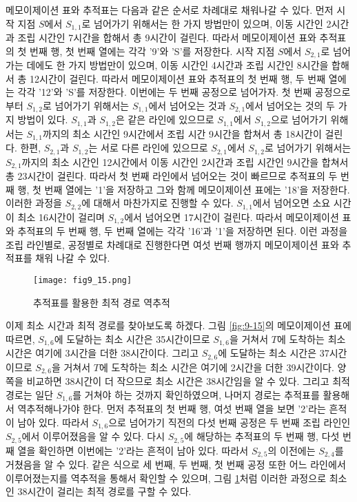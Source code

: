 \documentclass[a4paper]{oblivoir}
\begin{document}
메모이제이션 표와 추적표는 다음과 같은 순서로 차례대로 채워나갈 수 있다. 먼저 시작 지점 $S$에서 $S_{1,1}$로 넘어가기 위해서는 한 가지 방법만이 있으며, 이동 시간인 2시간과 조립 시간인 7시간을 합해서 총 9시간이 걸린다. 따라서 메모이제이션 표와 추적표의 첫 번째 행, 첫 번째 열에는 각각 '9'와 'S'를 저장한다. 시작 지점 $S$에서 $S_{2,1}$로 넘어가는 데에도 한 가지 방법만이 있으며, 이동 시간인 4시간과 조립 시간인 8시간을 합해서 총 12시간이 걸린다. 따라서 메모이제이션 표와 추적표의 첫 번째 행, 두 번째 열에는 각각 '12'와 'S'를 저장한다. 이번에는 두 번째 공정으로 넘어가자. 첫 번째 공정으로부터 $S_{1,2}$로 넘어가기 위해서는 $S_{1,1}$에서 넘어오는 것과 $S_{2,1}$에서 넘어오는 것의 두 가지 방법이 있다. $S_{1,1}$과 $S_{1,2}$은 같은 라인에 있으므로 $S_{1,1}$에서 $S_{1,2}$으로 넘어가기 위해서는 $S_{1,1}$까지의 최소 시간인 9시간에서 조립 시간 9시간을 합쳐서 총 18시간이 걸린다. 한편, $S_{2,1}$과 $S_{1,2}$는 서로 다른 라인에 있으므로 $S_{2,1}$에서 $S_{1,2}$로 넘어가기 위해서는 $S_{2,1}$까지의 최소 시간인 12시간에서 이동 시간인 2시간과 조립 시간인 9시간을 합쳐서 총 23시간이 걸린다. 따라서 첫 번째 라인에서 넘어오는 것이 빠르므로 추적표의 두 번째 행, 첫 번째 열에는 '1'을 저장하고 그와 함께 메모이제이션 표에는 '18'을 저장한다. 이러한 과정을 $S_{2,2}$에 대해서 마찬가지로 진행할 수 있다. $S_{1,1}$에서 넘어오면 소요 시간이 최소 16시간이 걸리며 $S_{1,2}$에서 넘어오면 17시간이 걸린다. 따라서 메모이제이션 표와 추적표의 두 번째 행, 두 번째 열에는 각각 '16'과 '1'을 저장하면 된다. 이런 과정을 조립 라인별로, 공정별로 차례대로 진행한다면 여섯 번째 행까지 메모이제이션 표와 추적표를 채워 나갈 수 있다. \\ 

\begin{figure}[ht] \centering 
\texttt{[image: fig9\_15.png]} 
\caption{추적표를 활용한 최적 경로 역추적}
\label{fig:9-16}
\end{figure}

이제 최소 시간과 최적 경로를 찾아보도록 하겠다. 그림 \ref{fig:9-15}의 메모이제이션 표에 따르면, $S_{1,6}$에 도달하는 최소 시간은 35시간이므로 $S_{1,6}$을 거쳐서 $T$에 도착하는 최소 시간은 여기에 3시간을 더한 38시간이다. 그리고 $S_{2,6}$에 도달하는 최소 시간은 37시간이므로 $S_{2,6}$을 거쳐서 $T$에 도착하는 최소 시간은 여기에 2시간을 더한 39시간이다. 양쪽을 비교하면 38시간이 더 작으므로 최소 시간은 38시간임을 알 수 있다. 그리고 최적 경로는 일단 $S_{1,6}$를 거쳐야 하는 것까지 확인하였으며, 나머지 경로는 추적표를 활용해서 역추적해나가야 한다. 먼저 추적표의 첫 번째 행, 여섯 번째 열을 보면 '2'라는 흔적이 남아 있다. 따라서 $S_{1,6}$으로 넘어가기 직전의 다섯 번째 공정은 두 번째 조립 라인인 $S_{2,5}$에서 이루어졌음을 알 수 있다. 다시 $S_{2,5}$에 해당하는 추적표의 두 번째 행, 다섯 번째 열을 확인하면 이번에는 '2'라는 흔적이 남아 있다. 따라서 $S_{2,5}$의 이전에는 $S_{2,4}$를 거쳤음을 알 수 있다. 같은 식으로 세 번째, 두 번째, 첫 번째 공정 또한 어느 라인에서 이루어졌는지를 역추적을 통해서 확인할 수 있으며, 그림 \ref{fig:9-16}처럼 이러한 과정으로 최소인 38시간이 걸리는 최적 경로를 구할 수 있다. \\
\end{document}
